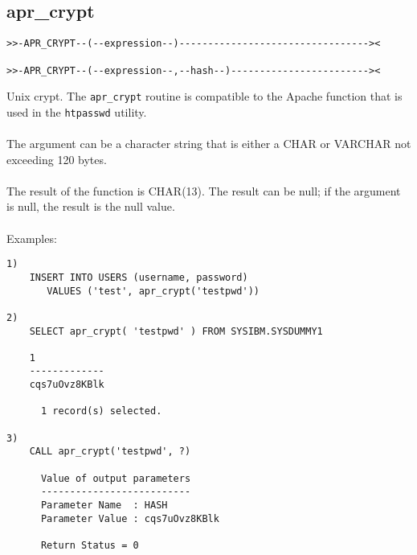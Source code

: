 \subsection{apr\_crypt} \label{aprcrypt}
\begin{verbatim}
>>-APR_CRYPT--(--expression--)---------------------------------><

>>-APR_CRYPT--(--expression--,--hash--)------------------------><
\end{verbatim}
Unix crypt. The {\tt apr\_crypt} routine is compatible to the Apache function that is used in the {\tt htpasswd} utility.\\
\\
The argument can be a character string that is either a \mbox{CHAR} or \mbox{VARCHAR} not exceeding 120 bytes.\\
\\
The result of the function is CHAR(13). The result can be null; if the argument is null, the result is the null value.\\
\\
Examples:
\begin{verbatim}
1)
    INSERT INTO USERS (username, password)
       VALUES ('test', apr_crypt('testpwd'))

2)
    SELECT apr_crypt( 'testpwd' ) FROM SYSIBM.SYSDUMMY1

    1
    -------------
    cqs7uOvz8KBlk

      1 record(s) selected.

3)
    CALL apr_crypt('testpwd', ?)

      Value of output parameters
      --------------------------
      Parameter Name  : HASH
      Parameter Value : cqs7uOvz8KBlk

      Return Status = 0
\end{verbatim}
\newpage
\hypertarget{haprsha1}{}
